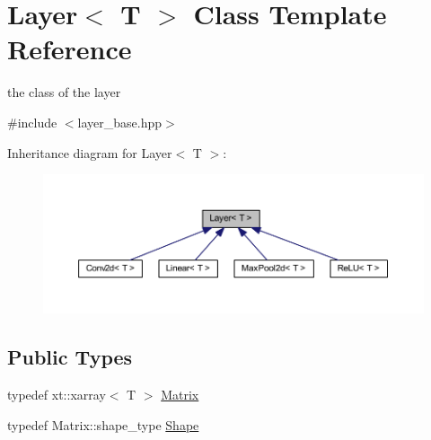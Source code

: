 \hypertarget{class_layer}{}\section{Layer$<$ T $>$ Class Template Reference}
\label{class_layer}


the class of the layer  




{\ttfamily \#include $<$layer\+\_\+base.\+hpp$>$}



Inheritance diagram for Layer$<$ T $>$\+:\nopagebreak
\begin{figure}[H]
\begin{center}
\leavevmode
\includegraphics[width=350pt]{class_layer__inherit__graph}
\end{center}
\end{figure}
\subsection*{Public Types}
\begin{DoxyCompactItemize}
\item 
typedef xt\+::xarray$<$ T $>$ \mbox{\hyperlink{class_layer_a22b1e7286096aa62bd245536c8ebdaf1}{Matrix}}
\item 
typedef Matrix\+::shape\+\_\+type \mbox{\hyperlink{class_layer_a8313f42d2292d12dd5d40cc115636693}{Shape}}
\end{DoxyCompactItemize}
